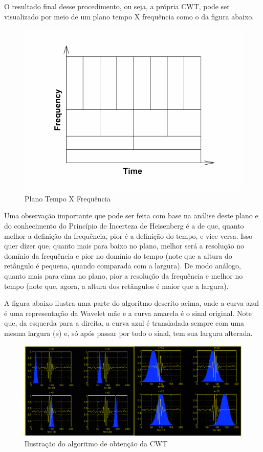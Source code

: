 \documentclass[12pt]{article}
\begin{document}
	O resultado final desse procedimento, ou seja, a própria \textrm{CWT}, pode ser visualizado por meio de um plano tempo X frequência como o da figura abaixo.
	\begin{figure}[H]
		\centering
		\includegraphics[width=0.7\linewidth]{Imagens/planoTempoFrequencia}
		\caption{Plano Tempo X Frequência}
		\label{fig:planotempofreq}
	\end{figure}
	
	Uma observação importante que pode ser feita com base na análise deste plano e do conhecimento do \textrm{Princípio de Incerteza de Heisenberg} \cite{WaveTutorial} é a de que, quanto melhor a definição da frequência, pior é a definição do tempo, e vice-versa. Isso quer dizer que, quanto mais para baixo no plano, melhor será a resolução no domínio da frequência e pior no domínio do tempo (note que a altura do retângulo é pequena, quando comparada com a largura). De modo análogo, quanto mais para cima no plano, pior a resolução da frequência e melhor no tempo (note que, agora, a altura dos retângulos é maior que a largura).
	
	A figura abaixo ilustra uma parte do algoritmo descrito acima, onde a curva azul é uma representação da \textrm{Wavelet} mãe e a curva amarela é o sinal original. Note que, da esquerda para a direita, a curva azul é transladada sempre com uma mesma largura ($s$) e, só após passar por todo o sinal, tem sua largura alterada.
	\begin{figure}[H]
		\centering
		\includegraphics[width=0.9\linewidth]{Imagens/passagemOnda}
		\caption{Ilustração do algoritmo de obtenção da CWT}
		\label{fig:passagemonda}
	\end{figure}
	
\end{document}
